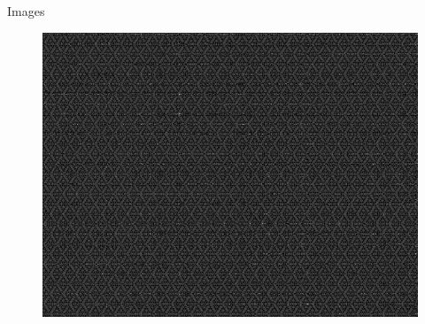 \documentclass{beamer}
\begin{document}
\begin{frame}{Images}
\begin{multicols}{3}
		\begin{figure}[h]
			\centering
			\includegraphics[width=0.8\linewidth]{./../data/images/presentation/p1_4_20_01_SVP_RMSE_023253.jpg}
		\end{figure}
	\end{multicols}
	
\end{frame}%
\end{document}
